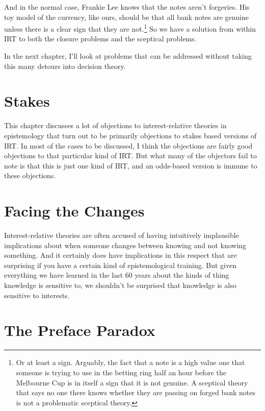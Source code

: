 \documentclass[11pt,]{book}
\let\rmarkdownfootnote\footnote%
\def\footnote{\protect\rmarkdownfootnote}
\begin{document}
And in the normal case, Frankie Lee knows that the notes aren't forgeries. His toy model of the currency, like ours, should be that all bank notes are genuine unless there is a clear sign that they are not.\footnote{Or at least a sign. Arguably, the fact that a note is a high value one that someone is trying to use in the betting ring half an hour before the Melbourne Cup is in itself a sign that it is not genuine. A sceptical theory that says no one there knows whether they are passing on forged bank notes is not a problematic sceptical theory.} So we have a solution from within IRT to both the closure problems and the sceptical problems.

In the next chapter, I'll look at problems that can be addressed without taking this many detours into decision theory.

\hypertarget{stakes}{%
\chapter{Stakes}\label{stakes}}

This chapter discusses a lot of objections to interest-relative theories in epistemology that turn out to be primarily objections to stakes based versions of IRT. In most of the cases to be discussed, I think the objections are fairly good objections to that particular kind of IRT. But what many of the objectors fail to note is that this is just one kind of IRT, and an odds-based version is immune to these objections.

\hypertarget{changesobjection}{%
\chapter{Facing the Changes}\label{changesobjection}}

Interest-relative theories are often accused of having intuitively implausible implications about when someone changes between knowing and not knowing something. And it certainly does have implications in this respect that are surprising if you have a certain kind of epistemological training. But given everything we have learned in the last 60 years about the kinds of thing knowledge is sensitive to, we shouldn't be surprised that knowledge is also sensitive to interests.

\hypertarget{preface}{%
\chapter{The Preface Paradox}\label{preface}}
\end{document}
